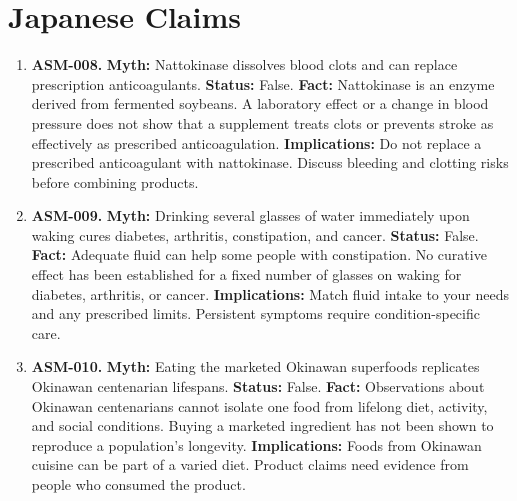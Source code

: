 \documentclass[11pt,oneside]{book}
\begin{document}
\section{Japanese Claims}
\begin{enumerate}[leftmargin=0pt,labelwidth=0pt,labelsep=0pt,itemindent=0pt]
\item[] \textbf{ASM-008.} \textbf{Myth:} Nattokinase dissolves blood clots and can replace prescription anticoagulants.\newline
\textbf{Status:} False.\newline
\textbf{Fact:} Nattokinase is an enzyme derived from fermented soybeans. A laboratory effect or a change in blood pressure does not show that a supplement treats clots or prevents stroke as effectively as prescribed anticoagulation. \cite{ref481}\newline
\textbf{Implications:} Do not replace a prescribed anticoagulant with nattokinase. Discuss bleeding and clotting risks before combining products.
\item[] \textbf{ASM-009.} \textbf{Myth:} Drinking several glasses of water immediately upon waking cures diabetes, arthritis, constipation, and cancer.\newline
\textbf{Status:} False.\newline
\textbf{Fact:} Adequate fluid can help some people with constipation. No curative effect has been established for a fixed number of glasses on waking for diabetes, arthritis, or cancer. \cite{ref292,ref388}\newline
\textbf{Implications:} Match fluid intake to your needs and any prescribed limits. Persistent symptoms require condition-specific care.
\item[] \textbf{ASM-010.} \textbf{Myth:} Eating the marketed Okinawan superfoods replicates Okinawan centenarian lifespans.\newline
\textbf{Status:} False.\newline
\textbf{Fact:} Observations about Okinawan centenarians cannot isolate one food from lifelong diet, activity, and social conditions. Buying a marketed ingredient has not been shown to reproduce a population's longevity. \cite{ref144}\newline
\textbf{Implications:} Foods from Okinawan cuisine can be part of a varied diet. Product claims need evidence from people who consumed the product.
\end{enumerate}
\end{document}
